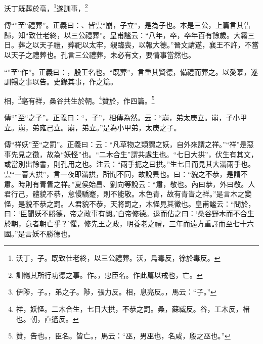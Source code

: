 沃丁既葬於亳，\footnote{沃丁，子。既致仕老終，以三公禮葬。沃，烏毒反，徐於毒反。}遂訓事，\footnote{訓暢其所行功德之事。作。，忠臣名。作此篇以戒也，亡。}

{\noindent\zhuan{}\fzbyks 傳“”至“禮葬”。正義曰：、皆雲“崩，子立”，是為子也。本是三公，上篇言其告歸，知“致仕老終，以三公禮葬”。皇甫謐云：“八年，卒，卒年百有餘歲。大霧三日。葬之以天子禮，葬祀以太牢，親臨喪，以報大德。”晉文請遂，襄王不許，不當以天子之禮葬也。孔言三公禮葬，未必有文，要情事當然也。 \par}

{\noindent\shu{}\fzkt “”至“作”。正義曰：，殷王名也。“既葬”，言重其賢德，備禮而葬之。以愛慕，遂訓暢之事以告。史錄其事，作之篇。 \par}

相，\footnote{伊陟，子。，弟之子。陟，張力反。相，息亮反。，馬云：“子。”}亳有祥，桑谷共生於朝。\footnote{祥，妖怪。二木合生，七日大拱，不恭之罰。桑，蘇臧反。谷，工木反，楮也。朝，直遙反。}贊於，作四篇。\footnote{贊，告也。，臣名。皆亡。，馬云：“巫，男巫也，名咸，殷之巫也。”}

{\noindent\zhuan{}\fzbyks 傳“”至“之子”。正義曰：“，子”，相傳為然。云：“崩，弟太庚立。崩，子小甲立。崩，弟雍己立。崩，弟立。”是為小甲弟，太庚之子。 \par}

{\noindent\zhuan{}\fzbyks 傳“祥妖”至“之罰”。正義曰：云：“凡草物之類謂之妖，自外來謂之祥。”“祥”是惡事先見之徵，故為“妖怪”也。“二木合生”謂共處生也。“七日大拱”，伏生有其文，或當別出餘書，則孔用之也。注云：“兩手扼之曰拱。”生七日而見其大滿兩手也。雲“一暮大拱”，言一夜即滿拱，所聞不同，故說異也。曰：“貌之不恭，是謂不肅。時則有青眚之祥。”夏侯始昌、劉向等說云：“肅，敬也。內曰恭，外曰敬。人君行己，體貌不恭，怠慢驕蹇，則不能敬。木色青，故有青眚之祥。”是言木之變怪，是貌不恭之罰。人君貌不恭，天將罰之，木怪見其徵也。皇甫謐云：“問於，曰：‘臣聞妖不勝德，帝之政事有闕。’白帝修德。退而佔之曰：‘桑谷野木而不合生於朝，意者朝亡乎？’懼，修先王之政，明養老之禮，三年而遠方重譯而至七十六國。”是言妖不勝德也。 \par}

